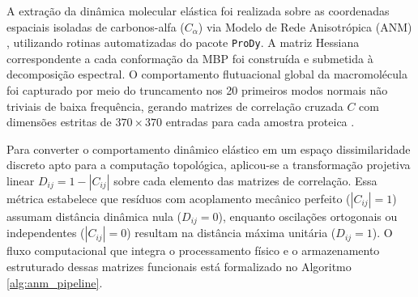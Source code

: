 \documentclass[12pt, a4paper]{article}
\theoremstyle{plain}
\theoremstyle{definition}
\theoremstyle{remark}
\newcommand{\ident}{\hspace{2em}}
\begin{document}
\ident A extração da dinâmica molecular elástica foi realizada sobre as coordenadas espaciais isoladas de carbonos-alfa ($C_\alpha$) via Modelo de Rede Anisotrópica (ANM) \cite{atilgan2001}, utilizando rotinas automatizadas do pacote \texttt{ProDy}. A matriz Hessiana correspondente a cada conformação da MBP foi construída e submetida à decomposição espectral. O comportamento flutuacional global da macromolécula foi capturado por meio do truncamento nos 20 primeiros modos normais não triviais de baixa frequência, gerando matrizes de correlação cruzada $C$ com dimensões estritas de $370 \times 370$ entradas para cada amostra proteica \cite{kovacev2016}.

\ident Para converter o comportamento dinâmico elástico em um espaço dissimilaridade discreto apto para a computação topológica, aplicou-se a transformação projetiva linear $D_{ij} = 1 - |C_{ij}|$ sobre cada elemento das matrizes de correlação. Essa métrica estabelece que resíduos com acoplamento mecânico perfeito ($|C_{ij}| = 1$) assumam distância dinâmica nula ($D_{ij} = 0$), enquanto oscilações ortogonais ou independentes ($|C_{ij}| = 0$) resultam na distância máxima unitária ($D_{ij} = 1$). O fluxo computacional que integra o processamento físico e o armazenamento estruturado dessas matrizes funcionais está formalizado no Algoritmo \ref{alg:anm_pipeline}.
\end{document}
